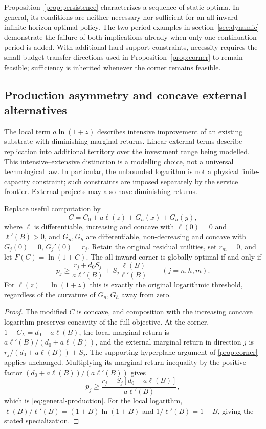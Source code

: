 Proposition~\ref{prop:persistence} characterizes a sequence of static
optima. In general, its conditions are neither necessary nor sufficient
for an all-inward infinite-horizon optimal policy. The two-period examples in
section~\ref{sec:dynamic} demonstrate the failure of both implications
already when only one continuation period is added.
With additional hard support constraints, necessity requires the small
budget-transfer directions used in Proposition~\ref{prop:corner} to remain
feasible; sufficiency is inherited whenever the corner remains feasible.

\subsection{Production asymmetry and concave external alternatives}
\label{sec:production}
The local term $a\ln(1+z)$ describes intensive improvement of an existing
substrate with diminishing marginal returns. Linear external terms describe
replication into additional territory over the investment range being
modelled. This intensive--extensive distinction is a modelling choice,
not a universal technological law. In particular, the unbounded logarithm
is not a physical finite-capacity constraint; such constraints are imposed
separately by the service frontier. External projects may also have
diminishing returns.

\begin{lemma}
\label{lem:production}
Replace useful computation by
\[
 C=C_0+a\ell(z)+G_n(x)+G_h(y),
\]
where $\ell$ is differentiable, increasing and concave with $\ell(0)=0$
and $\ell'(B)>0$, and $G_n,G_h$ are differentiable, non-decreasing and
concave with $G_j(0)=0$, $G_j'(0)=r_j$. Retain the original residual
utilities, set $r_m=0$, and let $F(C)=\ln(1+C)$. The all-inward corner
is globally optimal if and only if
\begin{equation}
 p_j\geq\frac{r_j+d_0S_j}{a\ell'(B)}
            +S_j\frac{\ell(B)}{\ell'(B)}
 \qquad(j=n,h,m).
 \label{eq:general-production}
\end{equation}
For $\ell(z)=\ln(1+z)$ this is exactly the original logarithmic
threshold, regardless of the curvature of $G_n,G_h$ away from zero.
\end{lemma}
\begin{proof}
The modified $C$ is concave, and composition with the increasing concave
logarithm preserves concavity of the full objective. At the corner,
$1+C_L=d_0+a\ell(B)$, the local marginal return is
$a\ell'(B)/(d_0+a\ell(B))$, and the external marginal return in
direction $j$ is $r_j/(d_0+a\ell(B))+S_j$.
The supporting-hyperplane argument of \cref{prop:corner} applies unchanged.
Multiplying its marginal-return inequality by the positive factor
$(d_0+a\ell(B))/(a\ell'(B))$ gives
\[
 p_j\geq\frac{r_j+S_j[d_0+a\ell(B)]}{a\ell'(B)},
\]
which is \cref{eq:general-production}. For the local logarithm,
$\ell(B)/\ell'(B)=(1+B)\ln(1+B)$ and
$1/\ell'(B)=1+B$, giving the stated specialization.
\end{proof}

